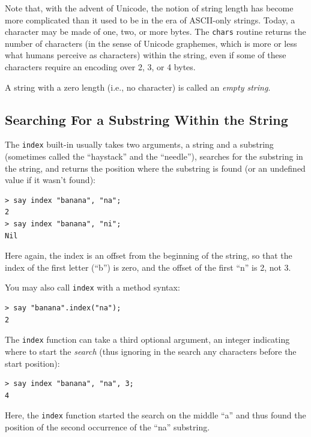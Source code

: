 Note that, with the advent of Unicode, the notion of 
string length has 
become more complicated than it used to be in the era
of ASCII-only strings. Today, a character may be made of one,
two, or more bytes. The {\tt chars} routine returns the 
number of characters (in the sense of Unicode graphemes, which
is more or less what humans perceive as characters) within 
the string, even if some of these characters require an 
encoding over 2, 3, or 4 bytes.

A string with a zero length (i.e., no character) is called 
an \emph{empty string}.

\subsection{Searching For a Substring Within the String}

\label{find}

The {\tt index} built-in usually takes two arguments, a string 
and a substring (sometimes called the ``haystack'' and the 
``needle''), searches for the substring in the string, and 
returns the position where the substring is found (or an 
undefined value if it wasn't found): 

\begin{verbatim}
> say index "banana", "na";
2
> say index "banana", "ni";
Nil
\end{verbatim}
%

Here again, the index is an offset from the beginning of the 
string, so that the index of the first letter (``b'') is zero, 
and the offset of the first ``n'' is 2, not 3.

You may also call {\tt index} with a method syntax:
\begin{verbatim}
> say "banana".index("na");
2
\end{verbatim}
%

The {\tt index} function can take a third optional argument, 
an integer indicating where to start the \emph{search} 
(thus ignoring in the search any characters before the 
start position):

\begin{verbatim}
> say index "banana", "na", 3;
4
\end{verbatim}
%
Here, the {\tt index} function started the search on the middle 
``a'' and thus found the position of the second occurrence of 
the ``na'' substring.

